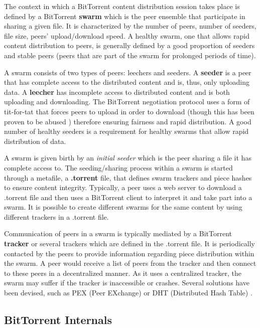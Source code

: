 The context in which a BitTorrent content distribution session takes place is
defined by a BitTorrent \textbf{swarm} which is the peer ensemble that
participate in sharing a given file. It is characterized by the number of
peers, number of seeders, file size, peers' upload/download speed. A healthy
swarm, one that allows rapid content distribution to peers, is generally
defined by a good proportion of seeders and stable peers (peers that are part
of the swarm for prolonged periods of time).

A swarm consists of two types of peers: leechers and seeders. A
\textbf{seeder} is a peer that has complete access to the distributed content
and is, thus, only uploading data. A \textbf{leecher} has incomplete access to
distributed content and is both uploading and downloading. The BitTorrent
negotiation protocol uses a form of tit-for-tat that forces peers to upload in
order to download (though this has been proven to be abused
\cite{free-riding}) therefore ensuring fairness and rapid distribution. A good
number of healthy seeders is a requirement for healthy swarms that allow rapid
distribution of data.

A swarm is given birth by an \textit{initial seeder} which is the peer sharing
a file it has complete access to. The seeding/sharing process within a swarm
is started through a metafile, a \textbf{.torrent} file, that defines swarm
trackers and piece hashes to ensure content integrity. Typically, a peer uses
a web server to download a .torrent file and then uses a BitTorrent client to
interpret it and take part into a swarm. It is possible to create different
swarms for the same content by using different trackers in a .torrent file.

Communication of peers in a swarm is typically mediated by a BitTorrent
\textbf{tracker} or several trackers which are defined in the .torrent file.
It is periodically contacted by the peers to provide information regarding
piece distribution within the swarm. A peer would receive a list of peers from
the tracker and then connect to these peers in a decentralized manner. As it
uses a centralized tracker, the swarm may suffer if the tracker is
inaccessible or crashes. Several solutions have been devised, such as PEX
(Peer EXchange) \cite{pex} or DHT (Distributed Hash Table) \cite{dht-paper}.


\subsection{BitTorrent Internals}

